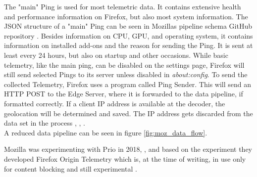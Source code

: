         The "main" Ping is used for most telemetric data. It contains extensive health and performance information on Firefox, but also most system information. The JSON structure of a "main" Ping can be seen in Mozillas pipeline schema GitHub repository \cite{mozilla_mozilla-servicesmozilla-pipeline-schemas_2020}. 
        Besides information on CPU, GPU, and operating system, it contains information on installed add-ons and the reason for sending the Ping.
        It is sent at least every 24 hours, but also on startup and other occasions. While basic telemetry, like the main ping, can be disabled on the settings page, Firefox will still send selected Pings to its server unless disabled in \textit{about:config}.
        To send the collected Telemetry, Firefox uses a program called Ping Sender.
        This will send an HTTP POST to the Edge Server, where it is forwarded to the data pipeline, if formatted correctly.
        If a client IP address is available at the decoder, the geolocation will be determined and saved.
        The IP address gets discarded from the data set in the process \cite{mozilla_overview_2020}, \cite{mozilla_http_2020}, \cite{firefox_ping_nodate}.\\
        A reduced data pipeline can be seen in figure \ref{fig:moz_data_flow}.
        
        
        
    
        Mozilla was experimenting with Prio in 2018, \cite{helmer_testing_2018}, and based on the experiment they developed Firefox Origin Telemetry  \cite{englehardt_next_2019} which is, at the time of writing, in use only for content blocking and still experimental \cite{noauthor_origin_nodate}.\\
    
    
